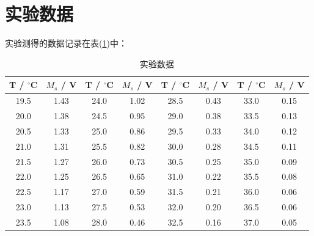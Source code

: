 \documentclass[a4paper]{article}
\begin{document}
\section{实验数据}
实验测得的数据记录在表(\ref{data:table})中：
\begin{table}[!h]
    \centering
    \begin{tabular}{|c|c|c|c|c|c|c|c|}
        \hline
        T / $^{\circ}$C & $M_s$ / V & T / $^{\circ}$C & $M_s$ / V & T / $^{\circ}$C & $M_s$ / V & T / $^{\circ}$C & $M_s$ / V \\ \hline
        19.5            & 1.43      & 24.0            & 1.02      & 28.5            & 0.43      & 33.0            & 0.15      \\ \hline
        20.0            & 1.38      & 24.5            & 0.95      & 29.0            & 0.38      & 33.5            & 0.13      \\ \hline
        20.5            & 1.33      & 25.0            & 0.86      & 29.5            & 0.33      & 34.0            & 0.12      \\ \hline
        21.0            & 1.31      & 25.5            & 0.82      & 30.0            & 0.28      & 34.5            & 0.11      \\ \hline
        21.5            & 1.27      & 26.0            & 0.73      & 30.5            & 0.25      & 35.0            & 0.09      \\ \hline
        22.0            & 1.25      & 26.5            & 0.65      & 31.0            & 0.22      & 35.5            & 0.08      \\ \hline
        22.5            & 1.17      & 27.0            & 0.59      & 31.5            & 0.21      & 36.0            & 0.06      \\ \hline
        23.0            & 1.13      & 27.5            & 0.53      & 32.0            & 0.20      & 36.5            & 0.06      \\ \hline
        23.5            & 1.08      & 28.0            & 0.46      & 32.5            & 0.16      & 37.0            & 0.05      \\ \hline
    \end{tabular}
    \caption{实验数据}\label{data:table}
\end{table}
\end{document}
